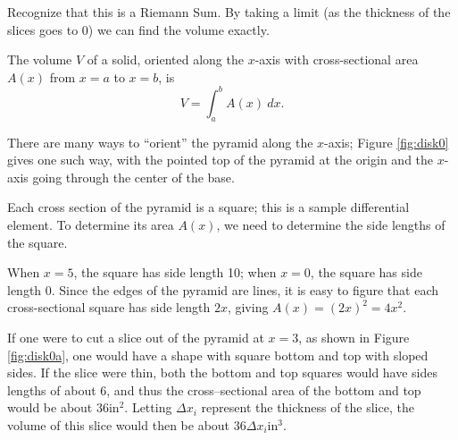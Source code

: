 Recognize that this is a Riemann Sum. By taking a limit (as the thickness of the slices goes to 0) we can find the volume exactly. 

{The volume $V$ of a solid, oriented along the $x$-axis with cross-sectional area $A(x)$ from $x=a$ to $x=b$, is 
$$V = \int_a^b A(x)\ dx.$$
}

{There are many ways to ``orient'' the pyramid along the $x$-axis; Figure \ref{fig:disk0} gives one such way, with the pointed top of the pyramid at the origin and the $x$-axis going through the center of the base.

Each cross section of the pyramid is a square; this is a sample differential element. To determine its area $A(x)$, we need to determine the side lengths of the square.

When $x=5$, the square has side length 10; when $x=0$, the square has side length 0. Since the edges of the pyramid are lines, it is easy to figure that each cross-sectional square has side length $2x$, giving $A(x) = (2x)^2=4x^2$. %

If one were to cut a slice out of the pyramid at $x=3$, as shown in Figure \ref{fig:disk0a}, one would have a shape with square bottom and top with sloped sides. If the slice were thin, both the bottom and top squares would have sides lengths of about 6, and thus the cross--sectional area of the bottom and top would be about 36in$^2$. Letting $\Delta x_i$ represent the thickness of the slice, the volume of this slice would then be about $36\Delta x_i$in$^3$. 

}
